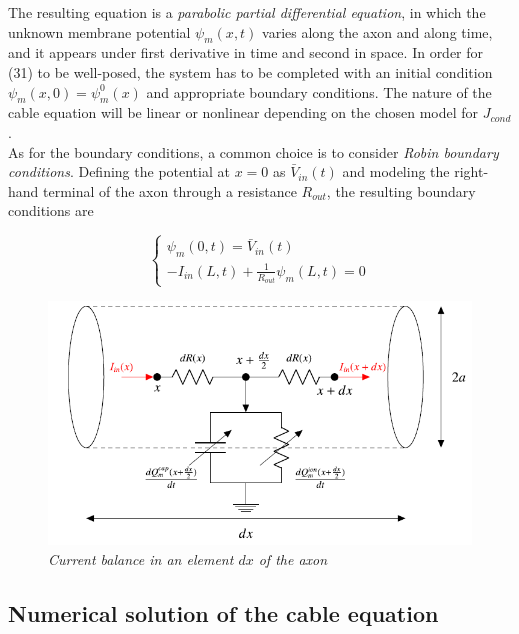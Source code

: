 \documentclass[a4paper]{article}
\begin{document}
The resulting equation is a \textit{parabolic partial differential equation}, in which the unknown membrane potential $\psi_m(x,t) $ varies along the axon and along time, and it appears under first derivative in time and second in space. In order for (31) to be well-posed, the system has to be completed with an initial condition $ \psi_m (x,0) = \psi_m^0(x)$ and appropriate boundary conditions. The nature of the cable equation will be linear or nonlinear depending on the chosen model for $J_{cond}$.\\
As for the boundary conditions, a common choice is to consider \textit{Robin boundary conditions}. Defining the potential at $x=0$ as $\bar{V}_{in}(t)$ and modeling the right-hand terminal of the axon through a resistance $R_{out}$, the resulting boundary conditions are

\begin{equation}
\begin{cases}
\psi_m(0,t) = \bar{V}_{in}(t) \\
-I_{in}(L,t) +\frac{1}{R_{out}}\psi_m(L,t) =0
\end{cases}
\end{equation}

\begin{figure}[H]
	\begin{center}
		
		\includegraphics[scale=0.5]{curr_bal.png} 
	\end{center} 
	\caption{\textit{Current balance in an element $dx$ of the axon}}
	
\end{figure}

\subsection{Numerical solution of the cable equation}
\end{document}
